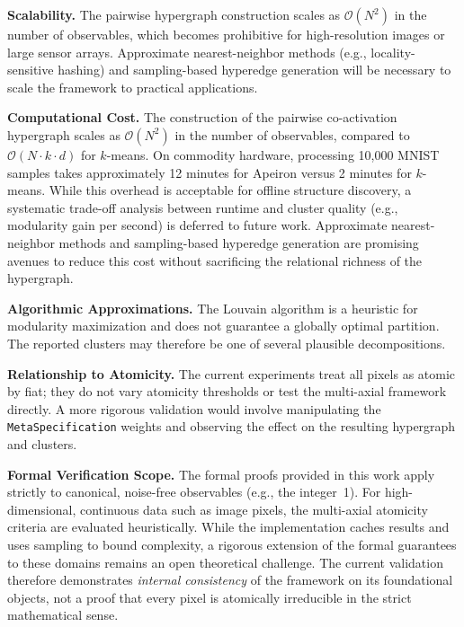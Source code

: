 \textbf{Scalability.} The pairwise hypergraph construction scales as $\mathcal{O}(N^2)$ in the number of observables, which becomes prohibitive for high-resolution images or large sensor arrays. Approximate nearest-neighbor methods (e.g., locality-sensitive hashing) and sampling-based hyperedge generation will be necessary to scale the framework to practical applications.

\textbf{Computational Cost.} The construction of the pairwise co-activation hypergraph scales as $\mathcal{O}(N^2)$ in the number of observables, compared to $\mathcal{O}(N \cdot k \cdot d)$ for $k$-means. On commodity hardware, processing 10,000 MNIST samples takes approximately 12 minutes for Apeiron versus 2 minutes for $k$-means. While this overhead is acceptable for offline structure discovery, a systematic trade-off analysis between runtime and cluster quality (e.g., modularity gain per second) is deferred to future work. Approximate nearest-neighbor methods and sampling-based hyperedge generation are promising avenues to reduce this cost without sacrificing the relational richness of the hypergraph.

\textbf{Algorithmic Approximations.} The Louvain algorithm is a heuristic for modularity maximization and does not guarantee a globally optimal partition. The reported clusters may therefore be one of several plausible decompositions.

\textbf{Relationship to Atomicity.} The current experiments treat all pixels as atomic by fiat; they do not vary atomicity thresholds or test the multi-axial framework directly. A more rigorous validation would involve manipulating the \texttt{MetaSpecification} weights and observing the effect on the resulting hypergraph and clusters.

\textbf{Formal Verification Scope.} The formal proofs provided in this work apply strictly to canonical, noise-free observables (e.g., the integer~1). For high-dimensional, continuous data such as image pixels, the multi-axial atomicity criteria are evaluated heuristically. While the implementation caches results and uses sampling to bound complexity, a rigorous extension of the formal guarantees to these domains remains an open theoretical challenge. The current validation therefore demonstrates \emph{internal consistency} of the framework on its foundational objects, not a proof that every pixel is atomically irreducible in the strict mathematical sense.

